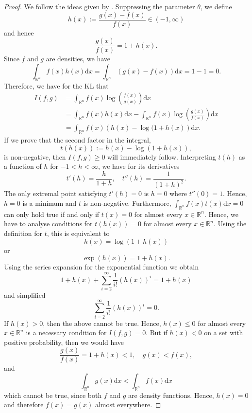 \documentclass[a4paper, 11pt]{scrreprt}
\newcommand{\RR}{\mathbb{R}}
\begin{document}
\begin{proof} We follow the ideas given by
\textcite[chapter 7.8]{burnham2003model}. Suppressing the parameter $\theta$, we define
\[ 
h(x) := \frac{g(x) - f(x)}{f(x)} \in (-1,\infty)
\]
and hence
\[ 
\frac{g(x)}{f(x)} = 1 + h(x).
\]
Since $f$ and $g$ are densities, we have 
\[
\int_{\RR^n} f(x)h(x) \mathrm{d}x  = \int_{\RR^n} (g(x) - f(x)) \mathrm{d}x = 1 - 1 = 0.
\]
Therefore, we have for the KL that
\begin{align*}
I(f,g) &= \int_{\RR^n} f(x) \log \left( \frac{f(x)}{g(x)}  \right) \mathrm{d}x \\
&= \int_{\RR^n} f(x)h(x) \mathrm{d}x - \int_{\RR^n} f(x) \log \left( \frac{g(x)}{f(x)} \right) \mathrm{d}x \\
&= \int_{\RR^n} f(x) \left( h(x) - \log ( 1+h(x) \right) \mathrm{d}x.
\end{align*}
If we prove that the second factor in the integral, 
\[ 
t(h(x)) := h(x) - \log(1+h(x)), 
\]
is non-negative, then $I(f,g) \geq 0$ will immediately follow.
Interpreting $t(h)$ as a function of $h$ for $-1<h<\infty$, we have for its derivatives
\[
t'(h) = \frac{h}{1+h}, \quad t''(h) = \frac{1}{(1+h)^2}.
\]
The only extremal point satisfying $t'(h)=0$ is $h=0$ where $t''(0)=1$. 
Hence, $h=0$ is a minimum and $t$ is non-negative.
Furthermore, $\int_{\RR^n} f(x) t(x) \mathrm{d}x = 0$ can only hold true if and only if $t(x) = 0$ for almost every $x\in\RR^n$. Hence, we have to analyse conditions for 
$t(h(x)) = 0$ for almost every $x\in\RR^n$.
Using the definition for $t$, this is equivalent to
\[
h(x) = \log(1+h(x))
\]
or
\[
\exp(h(x)) = 1+h(x).
\]
Using the series expansion for the exponential function we obtain
\[
1+h(x) + \sum_{i=2}^\infty \frac{1}{i!}(h(x))^i = 1+h(x)
\]
and simplified
\[ 
\sum_{i=2}^\infty \frac{1}{i!}(h(x))^i = 0.
\]
If $h(x) > 0$, then the above cannot be true. Hence, $h(x) \leq 0$ for almost every $x\in\RR^n$ is a necessary condition for $I(f,g) = 0$.
But if $h(x) < 0$ on a set with positive probability, then we would have
\[
\frac{g(x)}{f(x)} = 1+ h(x) < 1, \quad  g(x) < f(x),
\]
and 
\[
\int_{\RR^n} g(x) \mathrm{d}x < \int_{\RR^n} f(x) \mathrm{d}x
\]
which cannot be true, since both $f$ and $g$ are density functions.
Hence, $h(x)=0$ and therefore $f(x) = g(x)$ almost everywhere.
\end{proof}
\end{document}
